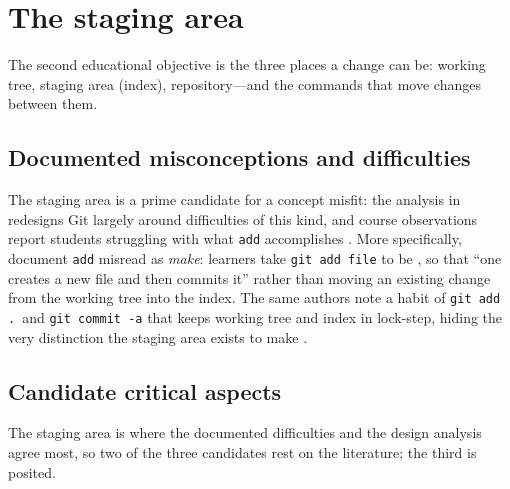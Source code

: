 \mode*
\section{The staging area}
\label{sec:staging}

The second educational objective is the three places a change can be:
working tree, staging area (index), repository---and the commands that move
changes between them.

\subsection{Documented misconceptions and difficulties}

The staging area is a prime candidate for a concept misfit: the analysis in
\textcite{DeRossoJackson2016Gitless} redesigns Git largely around
difficulties of this kind, and course observations report students
struggling with what \texttt{add} accomplishes
\autocite{IsomottonenCochez2014}.
More specifically, \textcite{IsomottonenCochez2014} document \texttt{add}
misread as \emph{make}: learners take \texttt{git add file} to be
, so that \enquote{one creates
a new file and then commits it} rather than moving an existing change from
the working tree into the index.
The same authors note a habit of \texttt{git add .}\ and \texttt{git commit
-a} that keeps working tree and index in lock-step, hiding the very
distinction the staging area exists to make \autocite{IsomottonenCochez2014}.

\subsection{Candidate critical aspects}
\label{sec:staging-aspects}

The staging area is where the documented difficulties and the design
analysis agree most, so two of the three candidates rest on the
literature; the third is posited.

